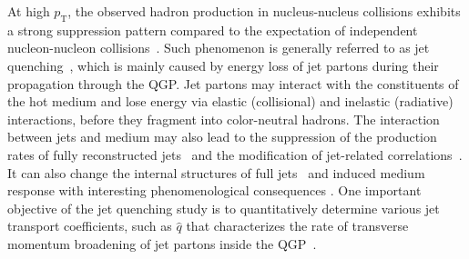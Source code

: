 \documentclass[aps,superscriptaddress,prc,twocolumn,nofootinbib]{revtex4}
\begin{document}
At high $p_\mathrm{T}$, the observed hadron production in nucleus-nucleus collisions exhibits a strong suppression pattern compared to the expectation of independent nucleon-nucleon collisions~\cite{Khachatryan:2016odn, Acharya:2018qsh, Aad:2015wga, Burke:2013yra, Buzzatti:2011vt, Chien:2015vja, Andres:2016iys, Cao:2017hhk, Zigic:2018ovr}.
Such phenomenon is generally referred to as jet quenching~\cite{Wang:1991xy, Qin:2015srf, Blaizot:2015lma, Majumder:2010qh, Gyulassy:2003mc, Cao:2020wlm, Qin:2007rn}, which is mainly caused by energy loss of jet partons during their propagation through the QGP.
Jet partons may interact with the constituents of the hot medium and lose energy via elastic (collisional) and inelastic (radiative) interactions, before they fragment into color-neutral hadrons.
The interaction between jets and medium may also lead to the suppression of the production rates of fully reconstructed jets~\cite{Aad:2014bxa, Khachatryan:2016jfl, Qin:2010mn, Young:2011qx, Dai:2012am, Wang:2013cia, Blaizot:2013hx, Mehtar-Tani:2014yea, Cao:2017qpx, Kang:2017frl, He:2018xjv} and the modification of jet-related correlations~\cite{Aad:2010bu, Chatrchyan:2012gt, Qin:2009bk, Chen:2016vem, Chen:2016cof, Chen:2017zte, Luo:2018pto, Zhang:2018urd, Kang:2018wrs}.
It can also change the internal structures of full jets~\cite{Chatrchyan:2013kwa, Aad:2014wha, Chang:2016gjp, Casalderrey-Solana:2016jvj, Tachibana:2017syd, KunnawalkamElayavalli:2017hxo, Brewer:2017fqy, Chien:2016led, Milhano:2017nzm, Chang:2019sae} and induced medium response with interesting phenomenological consequences \cite{Qin:2009uh, Tachibana:2017syd, Yang:2021iib, Casalderrey-Solana:2020rsj, Chen:2020tbl, Yan:2017rku, Milhano:2017nzm, Gao:2016ldo}.
One important objective of the jet quenching study is to quantitatively determine various jet transport coefficients, such as $\hat{q}$ that characterizes the rate of transverse momentum broadening of jet partons inside the QGP~\cite{Burke:2013yra,Cao:2021keo}.
\end{document}
